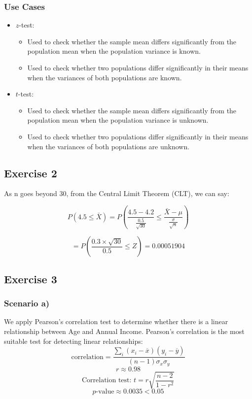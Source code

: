 \documentclass{article}
\begin{document}
\subsubsection*{Use Cases}
\begin{itemize}
    \item \( z \)-test:
    \begin{itemize}
        \item Used to check whether the sample mean differs significantly from the population mean when the population variance is known.
        \item Used to check whether two populations differ significantly in their means when the variances of both populations are known.
    \end{itemize}
    \item \( t \)-test:
    \begin{itemize}
        \item Used to check whether the sample mean differs significantly from the population mean when the population variance is unknown.
        \item Used to check whether two populations differ significantly in their means when the variances of both populations are unknown.
    \end{itemize}
\end{itemize}

\subsection*{Exercise 2}
As n goes beyond 30, from the Central Limit Theorem (CLT), we can say:

\[
P(4.5 \leq \bar{X}) = P\left( \frac{4.5 - 4.2}{\frac{0.5}{\sqrt{30}}} \leq \frac{\bar{X} - \mu}{\frac{\sigma}{\sqrt{n}}} \right)
\]

\[
= P\left( \frac{0.3 \times \sqrt{30}}{0.5} \leq Z \right) = 0.00051904
\]

\subsection*{Exercise 3}

\subsubsection*{Scenario a)}
We apply Pearson's correlation test to determine whether there is a linear relationship between Age and Annual Income. Pearson's correlation is the most suitable test for detecting linear relationships:
\[
\text{correlation} = \frac{\sum_i (x_i - \overline{x}) (y_i - \overline{y})}{(n - 1) \sigma_x \sigma_y}
\]
\[
r \approx 0.98
\]
\[
\text{Correlation test: } t = r\sqrt{\frac{n-2}{1-r^2}}
\]
\[
p\text{-value} \approx 0.0035 < 0.05
\]
\end{document}
